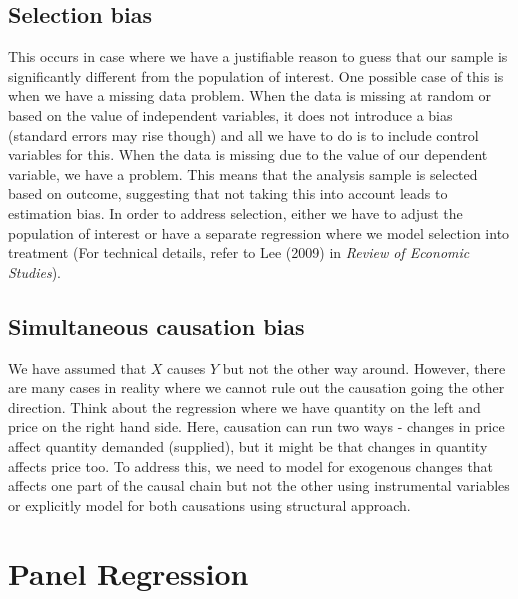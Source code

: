 \documentclass[12pt]{article}
\theoremstyle{definition}
\theoremstyle{property}
\theoremstyle{assumption}
\theoremstyle{example}
\theoremstyle{comment}
\begin{document}
\subsection{Selection bias}
This occurs in case where we have a justifiable reason to guess that our sample is significantly different from the population of interest. One possible case of this is when we have a missing data problem. When the data is missing at random or based on the value of independent variables, it does not introduce a bias (standard errors may rise though) and all we have to do is to include control variables for this. When the data is missing due to the value of our dependent variable, we have a problem. This means that the analysis sample is selected based on outcome, suggesting that not taking this into account leads to estimation bias. In order to address selection, either we have to adjust the population of interest or have a separate regression where we model selection into treatment (For technical details, refer to Lee (2009) in \textit{Review of Economic Studies}). 

\subsection{Simultaneous causation bias}
We have assumed that $X$ causes $Y$ but not the other way around. However, there are many cases in reality where we cannot rule out the causation going the other direction. Think about the regression where we have quantity on the left and price on the right hand side. Here, causation can run two ways - changes in price affect quantity demanded (supplied), but it might be that changes in quantity affects price too. To address this, we need to model for exogenous changes that affects one part of the causal chain but not the other using instrumental variables or explicitly model for both causations using structural approach. 


\section{Panel Regression}
\end{document}
